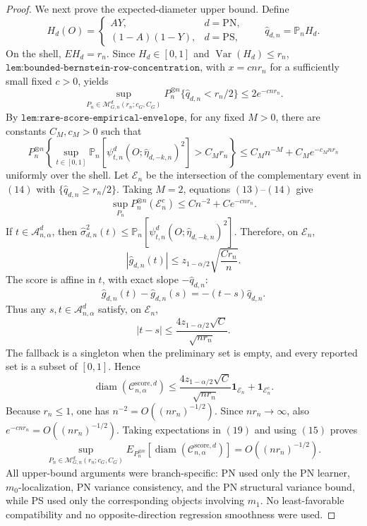 \documentclass{article}
\begin{document}
\begin{proof}
We next prove the expected-diameter upper bound. Define
\[H_d(O)=\begin{cases}AY,&d=\mathrm{PN},\\(1-A)(1-Y),&d=\mathrm{PS},\end{cases}\qquad \widehat q_{d,n}=\mathbb P_nH_d.\tag{12}\]
On the shell, \(EH_d=r_n\). Since \(H_d\in[0,1]\) and \(\operatorname{Var}(H_d)\le r_n\), \(\texttt{lem:bounded-bernstein-row-concentration}\), with \(x=c nr_n\) for a sufficiently small fixed \(c>0\), yields
\[\sup_{P_n\in\mathcal M_{G,n}^d(r_n;c_G,C_G)}P_n^{\otimes n}\{\widehat q_{d,n}<r_n/2\}\le2e^{-cnr_n}.\tag{13}\]
By \(\texttt{lem:rare-score-empirical-envelope}\), for any fixed \(M>0\), there are constants \(C_M,c_M>0\) such that
\[P_n^{\otimes n}\left\{\sup_{t\in[0,1]}\mathbb P_n[\psi_{t,n}^d(O;\widehat\eta_{d,-k,n})^2]>C_Mr_n\right\}\le C_Mn^{-M}+C_Me^{-c_Mnr_n}\tag{14}\]
uniformly over the shell. Let \(\mathcal E_n\) be the intersection of the complementary event in \((14)\) with \(\{\widehat q_{d,n}\ge r_n/2\}\). Taking \(M=2\), equations \((13)\)--\((14)\) give
\[\sup_{P_n}P_n^{\otimes n}(\mathcal E_n^c)\le Cn^{-2}+Ce^{-cnr_n}.\tag{15}\]
If \(t\in\mathcal A_{n,\alpha}^d\), then \(\widehat\sigma_{d,n}^2(t)\le\mathbb P_n[\psi_{t,n}^d(O;\widehat\eta_{d,-k,n})^2]\). Therefore, on \(\mathcal E_n\),
\[|\widehat g_{d,n}(t)|\le z_{1-\alpha/2}\sqrt{\frac{C r_n}{n}}.\tag{16}\]
The score is affine in \(t\), with exact slope \(-\widehat q_{d,n}\):
\[\widehat g_{d,n}(t)-\widehat g_{d,n}(s)=-(t-s)\widehat q_{d,n}.\tag{17}\]
Thus any \(s,t\in\mathcal A_{n,\alpha}^d\) satisfy, on \(\mathcal E_n\),
\[|t-s|\le\frac{4z_{1-\alpha/2}\sqrt C}{\sqrt{nr_n}}.\tag{18}\]
The fallback is a singleton when the preliminary set is empty, and every reported set is a subset of \([0,1]\). Hence
\[\operatorname{diam}(\mathcal C_{n,\alpha}^{\mathrm{score},d})\le\frac{4z_{1-\alpha/2}\sqrt C}{\sqrt{nr_n}}\mathbf1_{\mathcal E_n}+\mathbf1_{\mathcal E_n^c}.\tag{19}\]
Because \(r_n\le1\), one has \(n^{-2}=O((nr_n)^{-1/2})\). Since \(nr_n\to\infty\), also \(e^{-cnr_n}=O((nr_n)^{-1/2})\). Taking expectations in \((19)\) and using \((15)\) proves
\[\sup_{P_n\in\mathcal M_{G,n}^d(r_n;c_G,C_G)}E_{P_n^{\otimes n}}[\operatorname{diam}(\mathcal C_{n,\alpha}^{\mathrm{score},d})]=O((nr_n)^{-1/2}).\tag{20}\]
All upper-bound arguments were branch-specific: PN used only the PN learner, \(m_0\)-localization, PN variance consistency, and the PN structural variance bound, while PS used only the corresponding objects involving \(m_1\). No least-favorable compatibility and no opposite-direction regression smoothness were used.


\end{proof}
\end{document}
